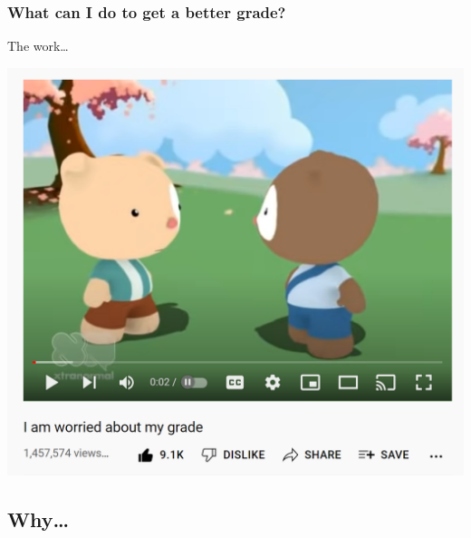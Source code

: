 \hypertarget{what-can-i-do-to-get-a-better-grade}{%
\subsubsection{What can I do to get a better grade?}\label{what-can-i-do-to-get-a-better-grade}}

The work\ldots{}

\begin{Shaded}
\begin{Highlighting}[]
\SpecialCharTok{::}\NormalTok{()) \{}
\NormalTok{(}\NormalTok{)}
\NormalTok{\}}\NormalTok{\{}
 \SpecialCharTok{\%\textgreater{}\%}
\NormalTok{() }\SpecialCharTok{\%\textgreater{}\%}
  \NormalTok{(}\NormalTok{)}
\NormalTok{\}}
\end{Highlighting}
\end{Shaded}

\includegraphics[width=18.14in]{img/worriedgrade}

\hypertarget{why}{%
\subsection{Why\ldots{}}\label{why}}

